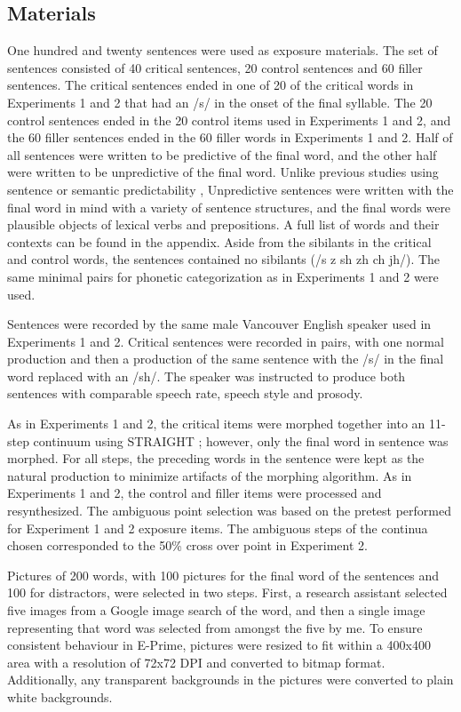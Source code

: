 \subsection{Materials}

One hundred and twenty sentences were used as exposure materials.  The set of sentences consisted of 40 critical sentences, 20 control sentences and 60 filler sentences.  The critical sentences ended in one of 20 of the critical words in Experiments 1 and 2 that had an /s/ in the onset of the final syllable.  The 20 control sentences ended in the 20 control items used in Experiments 1 and 2, and the 60 filler sentences ended in the 60 filler words in Experiments 1 and 2.  Half of all sentences were written to be predictive of the final word, and the other half were written to be unpredictive of the final word.  Unlike previous studies using sentence or semantic predictability \citep{Kalikow1977}, Unpredictive sentences were written with the final word in mind with a variety of sentence structures, and the final words were plausible objects of lexical verbs and prepositions.  A full list of words and their contexts can be found in the appendix. Aside from the sibilants in the critical and control words, the sentences contained no sibilants (/s z sh zh ch jh/).  The same minimal pairs for phonetic categorization as in Experiments 1 and 2 were used.

Sentences were recorded by the same male Vancouver English speaker used in Experiments 1 and 2.  Critical sentences were recorded in pairs, with one normal production and then a production of the same sentence with the /s/ in the final word replaced with an /sh/.  The speaker was instructed to produce both sentences with comparable speech rate, speech style and prosody.

As in Experiments 1 and 2, the critical items were morphed together into an 11-step continuum using STRAIGHT \citep{Kawahara2008}; however, only the final word in sentence was morphed.  For all steps, the preceding words in the sentence were kept as the natural production to minimize artifacts of the morphing algorithm.  As in Experiments 1 and 2, the control and filler items were processed and resynthesized.  The ambiguous point selection was based on the pretest performed for Experiment 1 and 2 exposure items.  The ambiguous steps of the continua chosen corresponded to the 50\% cross over point in Experiment 2.

Pictures of 200 words, with 100 pictures for the final word of the sentences and 100 for distractors, were selected in two steps.  First, a research assistant selected five images from a Google image search of the word, and then a single image representing that word was selected from amongst the five by me.  To ensure consistent behaviour in E-Prime, pictures were resized to fit within a 400x400 area with a resolution of 72x72 DPI and converted to bitmap format.  Additionally, any transparent backgrounds in the pictures were converted to plain white backgrounds.

